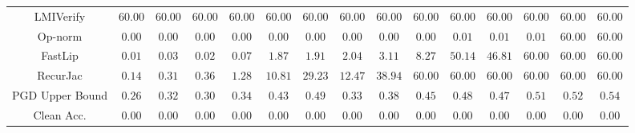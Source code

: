 \begin{table*}
{\begin{tabular}{c|c|c|c|c|c|c|c|c|c|c|c|c|c|c}
    LMIVerify &       $60.00$ &       $60.00$ &       $60.00$ &       $60.00$ &       $60.00$ &       $60.00$ &       $60.00$ &       $60.00$ &       $60.00$ &       $60.00$ &       $60.00$ &       $60.00$ &       $60.00$ &       $60.00$ \\
      Op-norm &        $0.00$ &        $0.00$ &        $0.00$ &        $0.00$ &        $0.00$ &        $0.00$ &        $0.00$ &        $0.00$ &        $0.00$ &        $0.01$ &        $0.01$ &        $0.01$ &       $60.00$ &       $60.00$ \\
      FastLip &        $0.01$ &        $0.03$ &        $0.02$ &        $0.07$ &        $1.87$ &        $1.91$ &        $2.04$ &        $3.11$ &        $8.27$ &       $50.14$ &       $46.81$ &       $60.00$ &       $60.00$ &       $60.00$ \\
     RecurJac &        $0.14$ &        $0.31$ &        $0.36$ &        $1.28$ &       $10.81$ &       $29.23$ &       $12.47$ &       $38.94$ &       $60.00$ &       $60.00$ &       $60.00$ &       $60.00$ &       $60.00$ &       $60.00$ \\
\hline
PGD Upper Bound &        $0.26$ &        $0.32$ &        $0.30$ &        $0.34$ &        $0.43$ &        $0.49$ &        $0.33$ &        $0.38$ &        $0.45$ &        $0.48$ &        $0.47$ &        $0.51$ &        $0.52$ &        $0.54$ \\
\hline
   Clean Acc. &        $0.00$ &        $0.00$ &        $0.00$ &        $0.00$ &        $0.00$ &        $0.00$ &        $0.00$ &        $0.00$ &        $0.00$ &        $0.00$ &        $0.00$ &        $0.00$ &        $0.00$ &        $0.00$ \\
\bottomrule

    \end{tabular}
    }
    \label{tab:exp-A-mnist-verify-time}
\end{table*}

